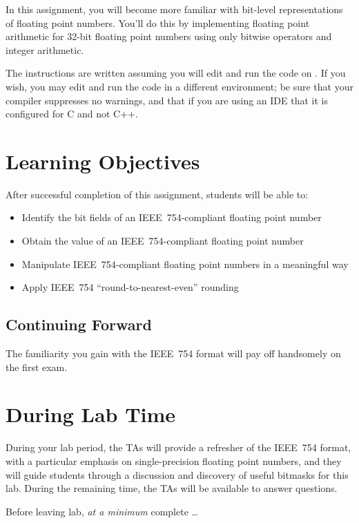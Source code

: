 In this assignment, you will become more familiar with bit-level representations of floating point numbers.
You'll do this by implementing floating point arithmetic for 32-bit floating point numbers using only bitwise operators and integer arithmetic.

The instructions are written assuming you will edit and run the code on \runtimeenvironment.
If you wish, you may edit and run the code in a different environment;
be sure that your compiler suppresses no warnings, and that if you are using an IDE that it is configured for C and not C++.

\section*{Learning Objectives}

After successful completion of this assignment, students will be able to:
\begin{itemize}
    \item Identify the bit fields of an IEEE~754-compliant floating point number
    \item Obtain the value of an IEEE~754-compliant floating point number
    \item Manipulate IEEE~754-compliant floating point numbers in a meaningful way
    \item Apply IEEE~754 ``round-to-nearest-even'' rounding
\end{itemize}

\subsection*{Continuing Forward}

The familiarity you gain with the IEEE~754 format will pay off handsomely on the first exam.

\section*{During Lab Time}

During your lab period, the TAs will provide a refresher of the IEEE~754 format, with a particular emphasis on single-precision floating point numbers, and they will guide students through a discussion and discovery of useful bitmasks for this lab.
During the remaining time, the TAs will be available to answer questions.

Before leaving lab, \textit{at a minimum} complete \dots